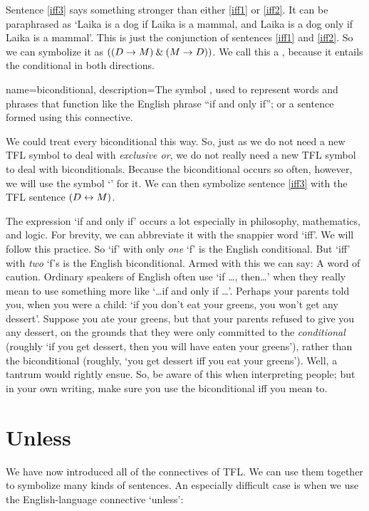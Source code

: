 Sentence \ref{iff3} says something stronger than either \ref{iff1} or \ref{iff2}. It can be paraphrased as `Laika is a dog if Laika is a mammal, and Laika is a dog only if Laika is a mammal'. This is just the conjunction of sentences \ref{iff1} and \ref{iff2}. So we can symbolize it as $((D \rightarrow M) \mathbin{\&} (M \rightarrow D))$. We call this a , because it entails the conditional in both directions. 

{
name=biconditional,
description={The symbol \eiff, used to represent words and phrases that function like the English phrase ``if and only if''; or a sentence formed using this connective.}
}

We could treat every biconditional this way. So, just as we do not need a new TFL symbol to deal with \emph{exclusive or}, we do not really need a new TFL symbol to deal with biconditionals. Because the biconditional occurs so often, however, we will use the symbol `\eiff' for it. We can then symbolize sentence \ref{iff3} with the TFL sentence $(D \leftrightarrow M)$. 

The expression `if and only if' occurs a lot especially in philosophy, mathematics, and logic. For brevity, we can abbreviate it with the snappier word `iff'. We will follow this practice. So `if' with only \emph{one} `f' is the English conditional. But `iff' with \emph{two} `f's is the English biconditional. Armed with this we can say:
A word of caution. Ordinary speakers of English often use `if \ldots, then\ldots' when they really mean to use something more like `\ldots if and only if \ldots'. Perhaps your parents told you, when you were a child: `if you don't eat your greens, you won't get any dessert'. Suppose you ate your greens, but that your parents refused to give you any dessert, on the grounds that they were only committed to the \emph{conditional} (roughly `if you get dessert, then you will have eaten your greens'), rather than the biconditional (roughly, `you get dessert iff you eat your greens'). Well, a tantrum would rightly ensue. So, be aware of this when interpreting people; but in your own writing, make sure you use the biconditional iff you mean to.

\section{Unless}
We have now introduced all of the connectives of TFL. We can use them together to symbolize many kinds of sentences. An especially difficult case is when we use the English-language connective `unless':

